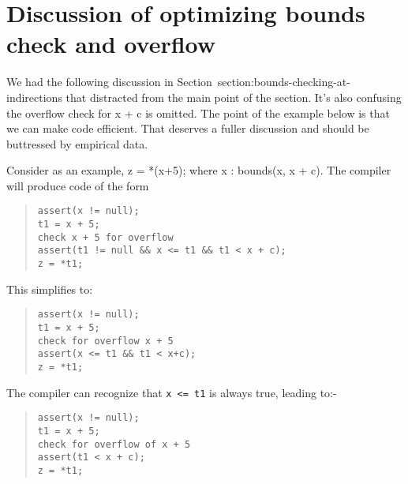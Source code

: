\section{Discussion of optimizing bounds check and overflow}

We had the following discussion in Section~{section:bounds-checking-at-indirections}
that distracted from the
main point of the section. It's also confusing the overflow check for x
+ c is omitted. The point of the example below is that we can make code
efficient. That deserves a fuller discussion and should be buttressed by
empirical data.

Consider as an example, z = *(x+5); where x : bounds(x, x + c). The
compiler will produce code of the form

\begin{quote}
\begin{verbatim}
assert(x != null);
t1 = x + 5;
check x + 5 for overflow
assert(t1 != null && x <= t1 && t1 < x + c);
z = *t1;
\end{verbatim}
\end{quote}

This simplifies to:

\begin{quote}
\begin{verbatim}
assert(x != null);
t1 = x + 5;
check for overflow x + 5
assert(x <= t1 && t1 < x+c);
z = *t1;
\end{verbatim}
\end{quote}

The compiler can recognize that \texttt{x <= t1} is always true,
leading to:-

\begin{quote}
\begin{verbatim}
assert(x != null);
t1 = x + 5;
check for overflow of x + 5
assert(t1 < x + c);
z = *t1;
\end{verbatim}
\end{quote}
